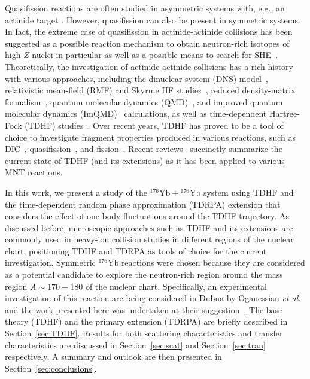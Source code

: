 \documentclass[reprint,aps,prc,twocolumn,superscriptaddress,floatfix,10pt]{revtex4-2}
\begin{document}
Quasifission reactions are often studied in asymmetric systems with, e.g., an actinide target \cite{toke1985,hinde1992,hinde1995,itkis2004,wakhle2014}.
However, quasifission can also be present in symmetric systems. In fact, the extreme case of quasifission in
 actinide-actinide collisions has been suggested as a possible reaction mechanism to obtain neutron-rich isotopes of high $Z$ nuclei in particular as well as a possible means to search for SHE~\cite{majka2018,wuenschel2018}.
Theoretically, the investigation of actinide-actinide collisions has a rich history with various approaches, including the dinuclear system (DNS) model~\cite{penionzhkevich2005,adamian2008,feng2009a,adamian2010,adamian2010b,feng2017,zhu2017,bao2018b}, relativistic mean-field (RMF) and Skyrme HF studies~\cite{gupta2007b}, reduced density-matrix formalism~\cite{sargsyan2009}, quantum molecular dynamics (QMD)~\cite{zhao2009}, and improved quantum molecular dynamics (ImQMD)~\cite{tian2008,zhao2016,wang2016,yao2017,li2018} calculations, as well as time-dependent Hartree-Fock (TDHF) studies~\cite{cusson1980,golabek2009,kedziora2010}.
Over recent years, TDHF has proved to be a tool of choice to investigate fragment properties produced in various reactions, such as DIC~\cite{umar2017,wu2019},  quasifission~\cite{wakhle2014,oberacker2014,hammerton2015,umar2015c,umar2016,wang2016,sekizawa2017a,godbey2019,jiang2020}, and fission~\cite{simenel2014a,scamps2015a,goddard2015,tanimura2015,goddard2016,bulgac2016,tanimura2017,scamps2018,bulgac2018,scamps2019}.
Recent reviews~\cite{simenel2018,sekizawa2019} succinctly summarize the current state of TDHF (and its extensions) as it has been applied to various MNT reactions.

In this work, we present a study of the $^{176}\mathrm{Yb}+{}^{176}\mathrm{Yb}$ system using TDHF and the time-dependent random phase approximation (TDRPA) extension that considers the effect of one-body fluctuations around the TDHF trajectory.
As discussed before, microscopic approaches such as TDHF and its extensions are commonly used in heavy-ion collision studies in different regions of the nuclear chart, positioning TDHF and TDRPA as tools of choice for the current investigation.
Symmetric $^{176}$Yb reactions were chosen because they are considered as a potential candidate to  explore the neutron-rich region around the mass region $A\sim 170-180$ of the nuclear chart.
Specifically, an experimental investigation of this reaction are being considered in Dubna by Oganessian \textit{et al.} and the work presented here was undertaken at their suggestion~\cite{priv_oganessian}.
The base theory (TDHF) and the primary extension (TDRPA) are briefly described in Section~\ref{sec:TDHF}.
Results for both scattering characteristics and transfer characteristics are discussed in Section~\ref{sec:scat} and Section~\ref{sec:tran} respectively.
A summary and outlook are then presented in Section~\ref{sec:conclusions}.
\end{document}
